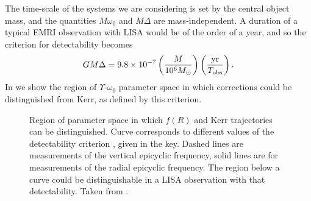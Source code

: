 The time-scale of the systems we are considering is set by the central object mass, and the quantities $M\omega_0$ and $M\Delta$ are mass-independent. A duration of a typical EMRI observation with LISA would be of the order of a year, and so the criterion for detectability becomes \citep{Berry2011}
\begin{equation}
GM\Delta = 9.8\times10^{-7} \left(\frac{M}{10^6 M_{\odot}}\right) \left(\frac{\mathrm{yr}}{T_\mathrm{obs}}\right). \label{eq:detcrit}
\end{equation}
In  we show the region of $\Upsilon$-$\omega_0$ parameter space in which corrections could be distinguished from Kerr, as defined by this criterion.
\begin{figure}%
\centering
{}
\quad{}
\caption{Region of parameter space in which $f(R)$ and Kerr trajectories can be distinguished. Curve corresponds to different values of the detectability criterion , given in the key. Dashed lines are measurements of the vertical epicyclic frequency, solid lines are for measurements of the radial epicyclic frequency. The region below a curve could be distinguishable in a LISA observation with that detectability. Taken from \citet{Berry2011}.}
\label{fig:epifig}
\end{figure}
